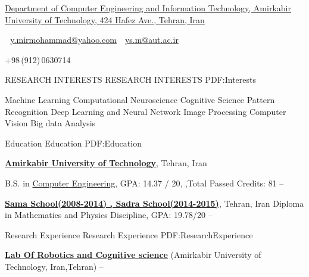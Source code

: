 \documentclass[letterpaper,MMMyyyy,nonstopmode]{simpleresumecv}
\newcommand{\CVAuthor}{ Yasaman Mirmohammad}
\newcommand{\CVWebpage}{}
\begin{document}

\Title{\CVAuthor}

\begin{SubTitle}
\href{https://www.google.com/maps/place/Amirkabir+University+of+Technology+(Polytechnic}
{Department of Computer Engineering and Information Technology, Amirkabir University of Technology, 424 Hafez Ave., Tehran, Iran}
\par
\,\SubBulletSymbol\,
\href{y.mirmohammad@yahoo.com}
{y.mirmohammad@yahoo.com}
\,\SubBulletSymbol\,
\href{ys.m@aut.ac.ir}
{ys.m@aut.ac.ir}
\,\SubBulletSymbol\,

+98\,(912)\,0630714
\,\SubBulletSymbol\,
\href{\CVWebpage}
{\url{\CVWebpage}}
\end{SubTitle}

\begin{Body}

\Section
{RESEARCH INTERESTS}
{RESEARCH INTERESTS}
{PDF:Interests}

\Entry

\BulletItem
Machine Learning
\BulletItem
Computational Neuroscience
\BulletItem
Cognitive Science
\BulletItem
Pattern Recognition
\BulletItem
Deep Learning and Neural Network
\BulletItem
Image Processing
\BulletItem
Computer Vision
\BulletItem
Big data Analysis



\Section
{Education}
{Education}
{PDF:Education}

\Entry
\href{http://www.aut.ac.ir}
{\textbf{Amirkabir University of Technology}},
Tehran, Iran

\Gap
\BulletItem
B.S. in
\href{http://ceit.aut.ac.ir}
{Computer Engineering}, 
  GPA: 14.37 / 20,
  ,Total Passed Credits: 81
\hfill
{} --  

\href{}
{\textbf{Sama School(2008-2014) , Sadra School(2014-2015)}},
Tehran, Iran
\BulletItem
Diploma in Mathematics and Physics Discipline, 
GPA: 19.78/20
\hfill
{}--

\begin{Detail}

\end{Detail}


\BullENCE %

\Section
{Research Experience}
{Research Experience}
{PDF:ResearchExperience}

\Entry
\href{}
{\textbf{Lab Of Robotics and Cognitive science}} 
\newline (Amirkabir University of Technology,
Iran,Tehran)
\hfill
{} --



\end{Body}
\end{document}
